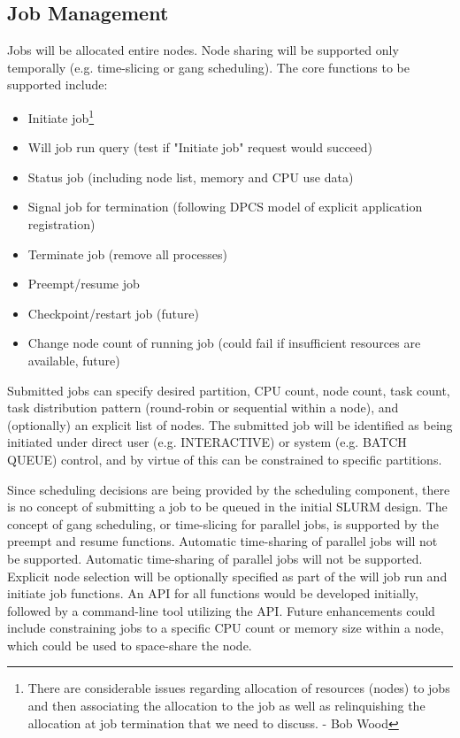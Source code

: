 \subsection{Job Management}

Jobs will be allocated entire nodes. Node sharing will be supported only temporally (e.g.
time-slicing or  gang scheduling). The core functions to be supported include:
\begin{itemize}
\item Initiate job\footnote{There are considerable issues regarding allocation 
of resources (nodes) to jobs and then associating the  allocation to the job 
as well as relinquishing the allocation at job termination that we need to 
discuss. - Bob Wood}
\item Will job run query (test if "Initiate job" request would succeed)
\item Status job (including node list, memory and CPU use data)
\item Signal job for termination (following DPCS model of explicit application
registration)
\item Terminate job (remove all processes)
\item Preempt/resume job 
\item Checkpoint/restart job (future)
\item Change node count of running job (could fail if insufficient resources are 
available, future)
\end{itemize}

Submitted jobs can specify desired partition, CPU count, node count, task 
count, task distribution pattern (round-robin or sequential within a node), 
and (optionally) an explicit list of nodes. The submitted job will be 
identified as being initiated under direct user (e.g. INTERACTIVE) or system 
(e.g. BATCH QUEUE) control, and by virtue of this can be constrained 
to specific partitions. 

Since scheduling decisions are being provided by the scheduling component,
there is no concept of submitting a job to be queued in the initial SLURM design. 
The concept of gang scheduling, or time-slicing for parallel jobs, is supported by the preempt and
resume functions. Automatic time-sharing of parallel jobs will not be
supported. Automatic time-sharing of parallel jobs will not be
supported. Explicit node selection will be optionally specified as part of the
will job run and initiate job functions. An API for all functions would be
developed initially, followed by a  command-line tool utilizing the API. Future
enhancements could include constraining jobs to a specific CPU count or memory
size within a node, which could be used to space-share the node.

